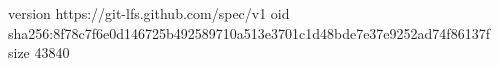 version https://git-lfs.github.com/spec/v1
oid sha256:8f78c7f6e0d146725b492589710a513e3701c1d48bde7e37e9252ad74f86137f
size 43840
